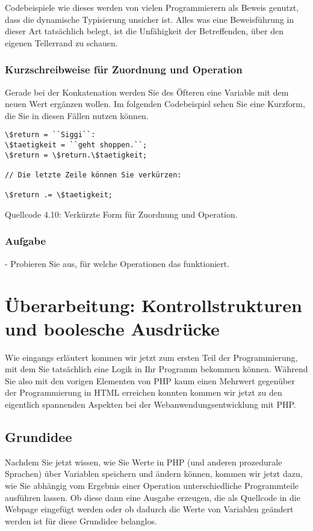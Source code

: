 Codebeispiele wie dieses werden von vielen Programmierern als Beweis genutzt, dass die dynamische Typisierung unsicher ist. Alles was eine Beweisführung in dieser Art tatsächlich belegt, ist die Unfähigkeit der Betreffenden, über den eigenen Tellerrand zu schauen.

\subsubsection{Kurzschreibweise für Zuordnung und Operation}

Gerade bei der Konkatenation werden Sie des Öfteren eine Variable mit dem neuen \glqq{}Wert\grqq{} ergänzen wollen. Im folgenden Codebeispiel sehen Sie eine Kurzform, die Sie in diesen Fällen nutzen können. 

\begin{verbatim}
\$return = ``Siggi``:
\$taetigkeit = ``geht shoppen.``;
\$return = \$return.\$taetigkeit;

// Die letzte Zeile können Sie verkürzen:

\$return .= \$taetigkeit;
\end{verbatim}
Quellcode 4.10: Verkürzte Form für Zuordnung und Operation.

\subsubsection{Aufgabe}

-	Probieren Sie aus, für welche Operationen das funktioniert.

\section{Überarbeitung: Kontrollstrukturen und boolesche Ausdrücke}

Wie eingangs erläutert kommen wir jetzt zum ersten Teil der Programmierung, mit dem Sie tatsächlich eine Logik in Ihr Programm bekommen können. Während Sie also mit den vorigen Elementen von PHP kaum einen Mehrwert gegenüber der Programmierung in HTML erreichen konnten kommen wir jetzt zu den eigentlich spannenden Aspekten bei der Webanwendungsentwicklung mit PHP.

\subsection{Grundidee}

Nachdem Sie jetzt wissen, wie Sie Werte in PHP (und anderen prozedurale Sprachen) über Variablen speichern und ändern können, kommen wir jetzt dazu, wie Sie abhängig vom Ergebnis einer Operation unterschiedliche Programmteile ausführen lassen. Ob diese dann eine Ausgabe erzeugen, die als Quellcode in die Webpage eingefügt werden oder ob dadurch die Werte von Variablen geändert werden ist für diese Grundidee belanglos.

